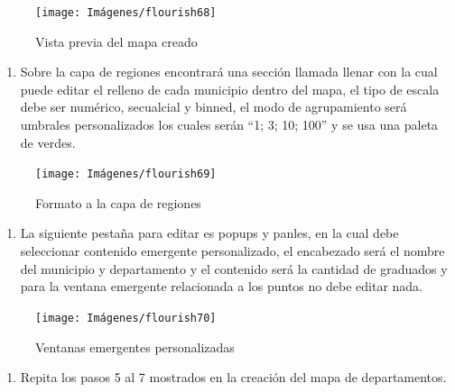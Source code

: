\documentclass[
]{book}
\providecommand{\tightlist}{%
  \setlength{\itemsep}{0pt}\setlength{\parskip}{0pt}}
\begin{document}
\begin{figure}

{\centering \texttt{[image: Imágenes/flourish68]} 

}

\caption{Vista previa del mapa creado}\label{fig:pasos1y2mapampiosflourish-fig}
\end{figure}

\begin{enumerate}
\def\labelenumi{\arabic{enumi}.}
\tightlist
\item
  Sobre la capa de regiones encontrará una sección llamada llenar con la cual puede editar el relleno de cada municipio dentro del mapa, el tipo de escala debe ser numérico, secualcial y binned, el modo de agrupamiento será umbrales personalizados los cuales serán ``1; 3; 10; 100'' y se usa una paleta de verdes.
\end{enumerate}

\begin{figure}

{\centering \texttt{[image: Imágenes/flourish69]} 

}

\caption{Formato a la capa de regiones}\label{fig:paso1mapampiosflourish-fig}
\end{figure}

\begin{enumerate}
\def\labelenumi{\arabic{enumi}.}
\setcounter{enumi}{1}
\tightlist
\item
  La siguiente pestaña para editar es popups y panles, en la cual debe seleccionar contenido emergente personalizado, el encabezado será el nombre del municipio y departamento y el contenido será la cantidad de graduados y para la ventana emergente relacionada a los puntos no debe editar nada.
\end{enumerate}

\begin{figure}

{\centering \texttt{[image: Imágenes/flourish70]} 

}

\caption{Ventanas emergentes personalizadas}\label{fig:paso2mapampiosflourish-fig}
\end{figure}

\begin{enumerate}
\def\labelenumi{\arabic{enumi}.}
\setcounter{enumi}{2}
\tightlist
\item
  Repita los pasos 5 al 7 mostrados en la creación del mapa de departamentos.
\end{enumerate}
\end{document}
